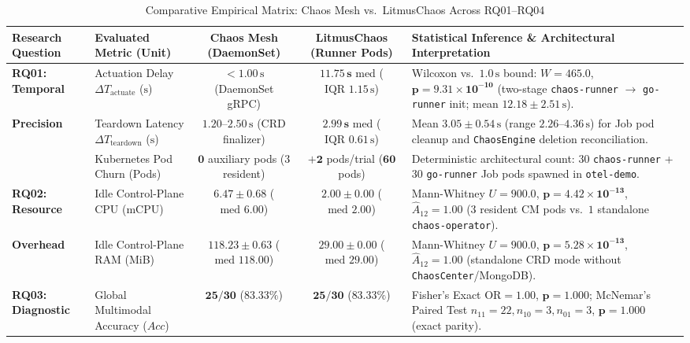 \begin{table}[!tbp]
\centering
\scriptsize
\setlength{\tabcolsep}{3.5pt}
\renewcommand{\arraystretch}{1.15}
\caption{Comparative Empirical Matrix: Chaos Mesh vs.\ LitmusChaos Across RQ01--RQ04}
\label{tab:cm_vs_litmus_results}
\begin{tabularx}{\textwidth}{p{2.2cm} p{2.9cm} c c X}
\toprule
\textbf{Research Question} & \textbf{Evaluated Metric (Unit)} & \textbf{Chaos Mesh (DaemonSet)} & \textbf{LitmusChaos (Runner Pods)} & \textbf{Statistical Inference \& Architectural Interpretation} \\
\midrule
\textbf{RQ01: Temporal} & Actuation Delay $\Delta T_{\text{actuate}}$ ($\text{s}$) & $< 1.00\,\text{s}$ (DaemonSet gRPC) & $\mathbf{11.75\,\text{s}}$ med ($\text{IQR } 1.15\,\text{s}$) & Wilcoxon vs.\ $1.0\,\text{s}$ bound: $W = 465.0$, $\mathbf{p = 9.31 \times 10^{-10}}$ (two-stage \texttt{chaos-runner} $\rightarrow$ \texttt{go-runner} init; mean $12.18 \pm 2.51\,\text{s}$). \\
\textbf{Precision} & Teardown Latency $\Delta T_{\text{teardown}}$ ($\text{s}$) & $1.20\text{--}2.50\,\text{s}$ (CRD finalizer) & $\mathbf{2.99\,\text{s}}$ med ($\text{IQR } 0.61\,\text{s}$) & Mean $3.05 \pm 0.54\,\text{s}$ (range $2.26\text{--}4.36\,\text{s}$) for Job pod cleanup and \texttt{ChaosEngine} deletion reconciliation. \\
& Kubernetes Pod Churn (Pods) & $\mathbf{0}$ auxiliary pods ($3$ resident) & $\mathbf{+2}$ pods/trial ($\mathbf{60}$ pods) & Deterministic architectural count: $30$ \texttt{chaos-runner} + $30$ \texttt{go-runner} Job pods spawned in \texttt{otel-demo}. \\
\midrule
\textbf{RQ02: Resource} & Idle Control-Plane CPU (mCPU) & $6.47 \pm 0.68$ ($\text{med } 6.00$) & $\mathbf{2.00 \pm 0.00}$ ($\text{med } 2.00$) & Mann-Whitney $U = 900.0$, $\mathbf{p = 4.42 \times 10^{-13}}$, $\hat{A}_{12} = 1.00$ ($3$ resident CM pods vs.\ $1$ standalone \texttt{chaos-operator}). \\
\textbf{Overhead} & Idle Control-Plane RAM (MiB) & $118.23 \pm 0.63$ ($\text{med } 118.00$) & $\mathbf{29.00 \pm 0.00}$ ($\text{med } 29.00$) & Mann-Whitney $U = 900.0$, $\mathbf{p = 5.28 \times 10^{-13}}$, $\hat{A}_{12} = 1.00$ (standalone CRD mode without \texttt{ChaosCenter}/MongoDB). \\
\midrule
\textbf{RQ03: Diagnostic} & Global Multimodal Accuracy ($Acc$) & $\mathbf{25/30}$ ($\mathbf{83.33\%}$) & $\mathbf{25/30}$ ($\mathbf{83.33\%}$) & Fisher's Exact $\text{OR} = 1.00$, $\mathbf{p = 1.000}$; McNemar's Paired Test $n_{11}=22, n_{10}=3, n_{01}=3$, $\mathbf{p = 1.000}$ (exact parity). \\

\end{tabularx}
\end{table}

